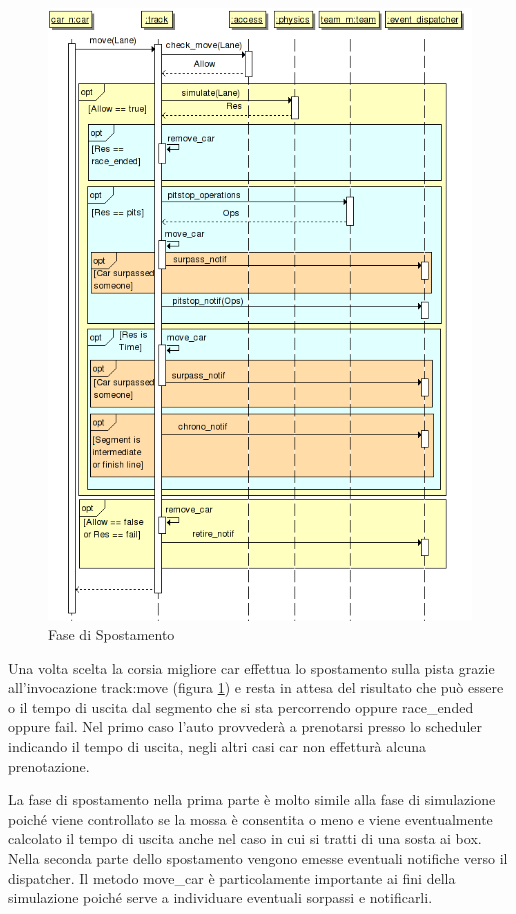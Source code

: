 \documentclass[11pt,a4paper]{report}
\begin{document}
\begin{figure}
\includegraphics[width=\textwidth]{diagrammi/Move}
\caption{Fase di Spostamento}
\label{fig:move}
\end{figure}

Una volta scelta la corsia migliore car effettua lo spostamento sulla pista grazie all'invocazione track:move (figura \ref{fig:move}) e resta in attesa del risultato che può essere o il tempo di uscita dal segmento che si sta percorrendo oppure race\_ended oppure fail. Nel primo caso l'auto provvederà a prenotarsi presso lo scheduler indicando il tempo di uscita, negli altri casi car non effetturà alcuna prenotazione.

La fase di spostamento nella prima parte è molto simile alla fase di simulazione poiché viene controllato se la mossa è consentita o meno e viene eventualmente calcolato il tempo di uscita anche nel caso in cui si tratti di una sosta ai box. Nella seconda parte dello spostamento vengono emesse eventuali notifiche verso il dispatcher.
Il metodo move\_car è particolamente importante ai fini della simulazione poiché serve a individuare eventuali sorpassi e notificarli.
\end{document}
